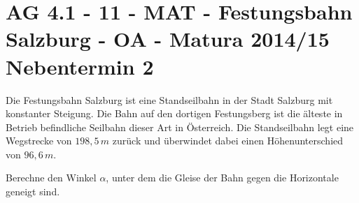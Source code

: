 \section{AG 4.1 - 11 - MAT - Festungsbahn Salzburg - OA - Matura 2014/15 Nebentermin 2}

\begin{beispiel}[AG 4.1]{1} %
				Die Festungsbahn Salzburg ist eine Standseilbahn in der Stadt Salzburg mit konstanter Steigung. Die Bahn auf den dortigen Festungsberg ist die älteste in Betrieb befindliche Seilbahn dieser Art in Österreich. Die Standseilbahn legt eine Wegstrecke von $198,5\,m$ zurück und überwindet dabei einen Höhenunterschied von $96,6\,m$.
				
				Berechne den Winkel $\alpha$, unter dem die Gleise der Bahn gegen die Horizontale geneigt sind.\\
				
\end{beispiel}